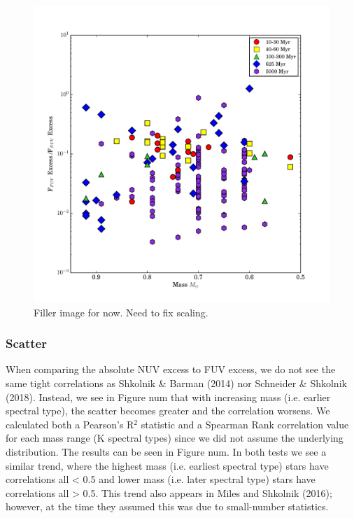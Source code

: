 \documentclass[twocolumn]{aastex62}
\begin{document}
\begin{figure}[h]
\includegraphics[width=\linewidth]{fuv_nuv_vs_mass_NO_J.pdf}
\caption{Filler image for now. Need to fix scaling. \label{fig:fuv_nuv_vs_mass}}
\end{figure}

\subsubsection{Scatter}

When comparing the absolute NUV excess to FUV excess, we do not see the same tight correlations as Shkolnik & Barman (2014) nor Schneider & Shkolnik (2018). Instead, we see in Figure num that with increasing mass (i.e. earlier spectral type), the scatter becomes greater and the correlation worsens. We calculated both a Pearson’s R$^2$ statistic and a Spearman Rank correlation value for each mass range (K spectral types) since we did not assume the underlying distribution.  The results can be seen in Figure num. In both tests we see a similar trend, where the highest mass (i.e. earliest spectral type) stars have correlations all < 0.5 and lower mass (i.e. later spectral type) stars have correlations all > 0.5. This trend also appears in Miles and Shkolnik (2016); however, at the time they assumed this was due to small-number statistics. 
\end{document}
